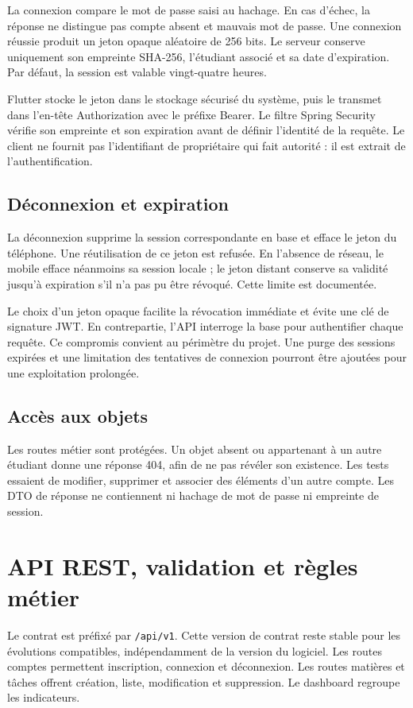 \documentclass[11pt,a4paper]{article}
\begin{document}
La connexion compare le mot de passe saisi au hachage. En cas d'échec, la réponse ne distingue pas compte absent et mauvais mot de passe. Une connexion réussie produit un jeton opaque aléatoire de 256 bits. Le serveur conserve uniquement son empreinte SHA-256, l'étudiant associé et sa date d'expiration. Par défaut, la session est valable vingt-quatre heures.

Flutter stocke le jeton dans le stockage sécurisé du système, puis le transmet dans l'en-tête Authorization avec le préfixe Bearer. Le filtre Spring Security vérifie son empreinte et son expiration avant de définir l'identité de la requête. Le client ne fournit pas l'identifiant de propriétaire qui fait autorité : il est extrait de l'authentification.

\subsection*{Déconnexion et expiration}
La déconnexion supprime la session correspondante en base et efface le jeton du téléphone. Une réutilisation de ce jeton est refusée. En l'absence de réseau, le mobile efface néanmoins sa session locale ; le jeton distant conserve sa validité jusqu'à expiration s'il n'a pas pu être révoqué. Cette limite est documentée.

Le choix d'un jeton opaque facilite la révocation immédiate et évite une clé de signature JWT. En contrepartie, l'API interroge la base pour authentifier chaque requête. Ce compromis convient au périmètre du projet. Une purge des sessions expirées et une limitation des tentatives de connexion pourront être ajoutées pour une exploitation prolongée.

\subsection*{Accès aux objets}
Les routes métier sont protégées. Un objet absent ou appartenant à un autre étudiant donne une réponse 404, afin de ne pas révéler son existence. Les tests essaient de modifier, supprimer et associer des éléments d'un autre compte. Les DTO de réponse ne contiennent ni hachage de mot de passe ni empreinte de session.
\newpage
\section{API REST, validation et règles métier}
Le contrat est préfixé par \texttt{/api/v1}. Cette version de contrat reste stable pour les évolutions compatibles, indépendamment de la version du logiciel. Les routes comptes permettent inscription, connexion et déconnexion. Les routes matières et tâches offrent création, liste, modification et suppression. Le dashboard regroupe les indicateurs.
\end{document}
